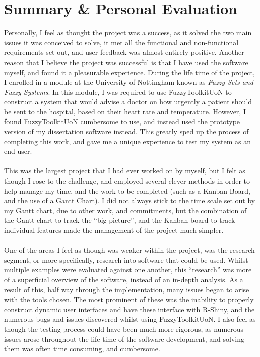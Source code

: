 \section{Summary \& Personal Evaluation}
Personally, I feel as thought the project was a success, as it solved the two main issues it was conceived to solve, it met all the functional and non-functional requirements set out, and user feedback was almost entirely positive. Another reason that I believe the project was successful is that I have used the software myself, and found it a pleasurable experience. During the life time of the project, I enrolled in a module at the University of Nottingham known as \emph{Fuzzy Sets and Fuzzy Systems}\cite{uon2014fuz}. In this module, I was required to use FuzzyToolkitUoN to construct a system that would advise a doctor on how urgently a patient should be sent to the hospital, based on their heart rate and temperature. However, I found FuzzyToolkitUoN cumbersome to use, and instead used the prototype version of my dissertation software instead. This greatly sped up the process of completing this work, and gave me a unique experience to test my system as an end user.\ \\
\ \\
This was the largest project that I had ever worked on by myself, but I felt as though I rose to the challenge, and employed several clever methods in order to help manage my time, and the work to be completed (such as a Kanban Board, and the use of a Gantt Chart). I did not always stick to the time scale set out by my Gantt chart, due to other work, and commitments, but the combination of the Gantt chart to track the ``big-picture'', and the Kanban board to track individual features made the management of the project much simpler.\ \\
\ \\
One of the areas I feel as though was weaker within the project, was the research segment, or more specifically, research into software that could be used. Whilst multiple examples were evaluated against one another, this ``research'' was more of a superficial overview of the software, instead of an in-depth analysis. As a result of this, half way through the implementation, many issues began to arise with the tools chosen. The most prominent of these was the inability to properly construct dynamic user interfaces and have these interface with R-Shiny, and the numerous bugs and issues discovered whilst using FuzzyToolkitUoN. I also feel as though the testing process could have been much more rigorous, as numerous issues arose throughout the life time of the software development, and solving them was often time consuming, and cumbersome.\ \\
